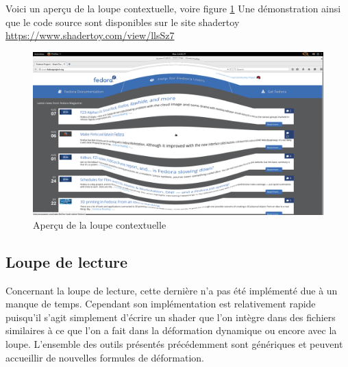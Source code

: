 Voici un aperçu de la loupe contextuelle, voire figure \ref{fig:loupeContexte}
Une démonstration ainsi que le code source sont disponibles sur le site shadertoy \url{https://www.shadertoy.com/view/llsSz7}
\begin{figure}[!h]
	\center	
	\includegraphics[scale=0.25]{image/loupeContexte.png}
	\caption{Aperçu de la loupe contextuelle}
	\label{fig:loupeContexte}
\end{figure}

\subsection{Loupe de lecture}

Concernant la loupe de lecture, cette dernière n'a pas été implémenté due à un manque de temps. Cependant son implémentation est relativement rapide puisqu'il s'agit simplement d'écrire un shader que l'on intègre dans des fichiers similaires à ce que l'on a fait dans la déformation dynamique ou encore avec la loupe. L'ensemble des outils présentés précédemment sont génériques et peuvent accueillir de nouvelles formules de déformation.